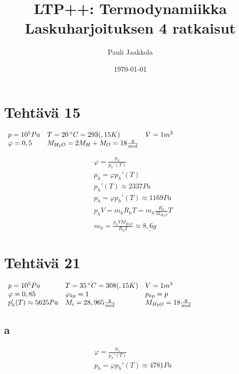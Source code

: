 \documentclass[12pt,a4paper,finnish]{article}
\title{LTP++: Termodynamiikka\\Laskuharjoituksen 4 ratkaisut}
\date{\today}
\author{Pauli Jaakkola}
\begin{document}
\maketitle
\tableofcontents
\newpage

\section{Tehtävä 15}

\begin{math}
\begin{array}{l l l}
 p = 10^5 Pa & T = 20 \,^{\circ}C = 293(,15 K) & V = 1 m^3\\
 \varphi = 0,5 & M_{H_2O} = 2M_H + M_O = 18 \frac{g}{mol} & 
\end{array}
\end{math}

\begin{align}
 &\varphi = \frac{p_h}{p_h'(T)}\\
 &p_h = \varphi p_h'(T)\\
 &p_h'(T) \approx 2337 Pa\\
 &p_h = \varphi p_h'(T) \approx 1169 Pa\\
 &p_hV = m_hR_hT = m_h\frac{R_u}{M_{H_2O}}T\\
 &m_h = \frac{p_hVM_{H_2O}}{R_uT} \approx \underline{8,6 g}
\end{align}

\section{Tehtävä 21}

\begin{math}
 \begin{array}{l l l}
  p = 10^5 Pa & T = 35 \,^{\circ}C = 308(,15 K) & V = 1 m^3\\
  \varphi = 0,85 & \varphi_{kp} = 1 & p_{kp} = p\\
  p_h'(T) \approx 5625 Pa & M_i = 28,965\frac{g}{mol} & M_{H_2O} = 18\frac{g}{mol}
 \end{array}
\end{math}

\subsection{a}

\begin{align}
 &\varphi = \frac{p_h}{p_h'(T)}\\
 &p_h = \varphi p_h'(T) \approx \underline{4781 Pa}
\end{align}
\end{document}
